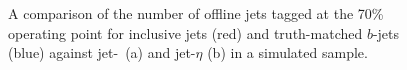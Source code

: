 \begin{figure}[!ht]
  \begin{center}
    \captionsetup[subfigure]{aboveskip=0pt,justification=centering}
  \end{center}
  \caption{A comparison of the number of offline jets tagged at the 70\% operating point
    for inclusive jets (red) and truth-matched $b$-jets (blue)
    against jet-\pT~(a) and jet-$\eta$ (b) in a simulated sample.}
  \label{fig:Purity}
\end{figure}

